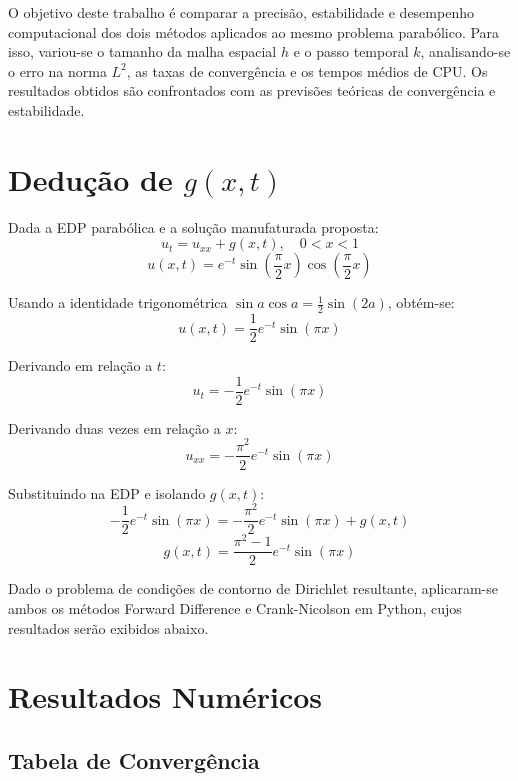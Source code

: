 \documentclass[10pt,twocolumn]{article}
\begin{document}
O objetivo deste trabalho é comparar a precisão, estabilidade e desempenho computacional dos dois métodos aplicados ao mesmo problema parabólico. Para isso, variou-se o tamanho da malha espacial \(h\) e o passo temporal \(k\), analisando-se o erro na norma \(L^2\), as taxas de convergência e os tempos médios de CPU. Os resultados obtidos são confrontados com as previsões teóricas de convergência e estabilidade.

\newpage
\section*{Dedução de \( g(x,t) \)}

Dada a EDP parabólica e a solução manufaturada proposta:
\[
u_t = u_{xx} + g(x,t), \quad 0 < x < 1
\]
\[
u(x,t) = e^{-t} \sin\left( \frac{\pi}{2} x \right) \cos\left( \frac{\pi}{2} x \right)
\]

Usando a identidade trigonométrica \(\sin a \cos a = \frac{1}{2}\sin(2a)\), obtém-se:
\[
u(x,t) = \frac{1}{2} e^{-t} \sin(\pi x)
\]

Derivando em relação a \(t\):
\[
u_t = -\frac{1}{2} e^{-t} \sin(\pi x)
\]

Derivando duas vezes em relação a \(x\):
\[
u_{xx} = -\frac{\pi^2}{2} e^{-t} \sin(\pi x)
\]

Substituindo na EDP e isolando \(g(x,t)\):
\[
-\frac{1}{2} e^{-t} \sin(\pi x) = -\frac{\pi^2}{2} e^{-t} \sin(\pi x) + g(x,t)
\]
\[
\boxed{g(x,t) = \frac{\pi^2 - 1}{2} e^{-t} \sin(\pi x)}
\]

Dado o problema de condições de contorno de Dirichlet resultante, aplicaram-se ambos os métodos Forward Difference e Crank-Nicolson em Python, cujos resultados serão exibidos abaixo.

\newpage

\section{Resultados Numéricos}

\subsection{Tabela de Convergência}

\begin{table}[H]
\centering

\caption{\small Resultados do método Forward Difference para diferentes refinamentos de malha}
\label{tab:convergencia}
\end{table}
\end{document}
